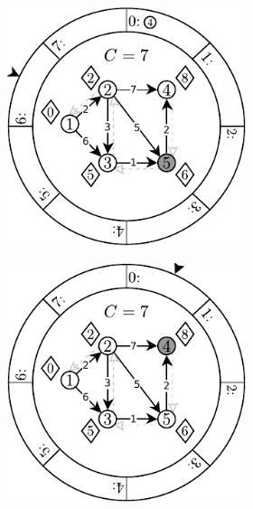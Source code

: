 \begin{figure}[!htbp]
\begin{subfigure}[b]{\textwidth}
\begin{subfigure}[b]{0.3\textwidth}
			\caption{}
			\label{fig:exampleDial:d}
		\end{subfigure}
		\hfill
		\begin{subfigure}[b]{0.3\textwidth}
			\includegraphics[width=\textwidth]{Chapter_II/DIAL-Example/e.pdf}
			\caption{}
			\label{fig:exampleDial:e}
		\end{subfigure}
		\hfill
		\begin{subfigure}[b]{0.3\textwidth}
			\includegraphics[width=\textwidth]{Chapter_II/DIAL-Example/f.pdf}

\end{subfigure}
\end{subfigure}
\end{figure}
